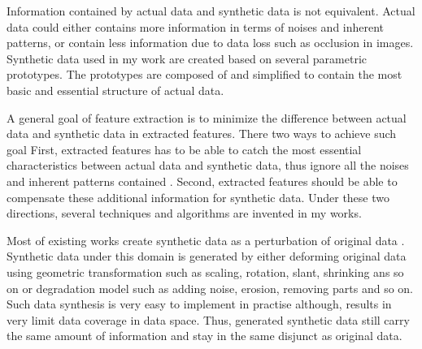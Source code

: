 \documentclass{iitthesis}
\begin{document}

Information contained by actual data and synthetic data is not equivalent. Actual data could either contains more information in terms of noises and inherent patterns, or contain less information due to data loss such as occlusion in images. Synthetic data used in my work are created based on several parametric prototypes. The prototypes are composed of and simplified to contain the most basic and essential structure of actual data. 

A general goal of feature extraction is to minimize the difference between actual data and synthetic data in extracted features. There two ways to achieve such goal First, extracted features has to be able to catch the most essential characteristics between actual data and synthetic data, thus ignore all the noises and inherent patterns contained . Second, extracted features should be able to compensate these additional information for synthetic data. Under these two directions, several techniques and algorithms are invented in my works. 

 \label{Learn: relatedwork}

Most of existing works create synthetic data as a perturbation of original data \cite{Comput.Sci.&Appl.Math.1997}\cite{Ulanova2014}\cite{2012}\cite{VT:03}\cite{VT:04}\cite{NJ:09}. Synthetic data under this domain is generated by either deforming original data using geometric transformation such as scaling, rotation, slant, shrinking ans so on or degradation model such as adding noise, erosion, removing parts and so on. Such data synthesis is very easy to implement in practise although, results in very limit data coverage in data space. Thus, generated synthetic data still carry the same amount of information and stay in the same disjunct as original data. 
\end{document}
